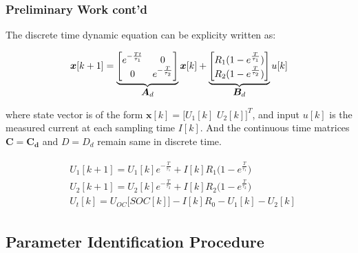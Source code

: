 \documentclass{beamer}
\begin{document}
\begin{frame}
	
	\frametitle{Preliminary Work cont'd}
	
	The discrete time dynamic equation can be explicity written as:
	
	\begin{equation}
		\label{eqn:discrete_state_space_matrix_form}
		\bm{x}[k+1] = \underbrace{\begin{bmatrix}
				e^{-\frac{Tt}{\tau_{1}}} & 0 \\
				0 & e^{-\frac{T}{\tau_{2}}} 
		\end{bmatrix}}_{\let\scriptstyle\textstyle\substack{\bm{A}_{d}}} \bm{x}[k] + \underbrace{\begin{bmatrix}
				R_{1}(1 - e^{\frac{T}{\tau_{1}}})  \\
				R_{2}(1 - e^{\frac{T}{\tau_{2}}})  
		\end{bmatrix}}_{\let\scriptstyle\textstyle\substack{\bm{B}_{d}}} u[k]
	\end{equation}

	where state vector is of the form $\bm{x}[k] = \big[U_{1}[k]\,\,U_{2}[k]\big]^{T}$, and input $u[k]$ is the measured current at each sampling time $I[k]$. And the continuous time matrices $\bm{C} = \bm{C_{d}}$ and $D=D_{d}$ remain same in discrete time.
	
	\begin{align}
		\label{eqn:discrete_state_space_equation_form}
		\begin{split}
			&U_{1}[k+1] = U_{1}[k]e^{-\frac{T}{\tau_{1}}} + I[k] R_{1}\big(1 - e^{\frac{T}{\tau_{1}}}\big) \\
			&U_{2}[k+1] = U_{2}[k]e^{-\frac{T}{\tau_{2}}} + I[k] R_{2}\big(1 - e^{\frac{T}{\tau_{2}}}\big)\\ 
			&U_{t}[k] = U_{OC}\big[SOC[k]\big] - I[k] R_{0} - U_{1}[k] - U_{2}[k]
		\end{split}
	\end{align}

\end{frame}

\subsection{Parameter Identification Procedure}
\end{document}
